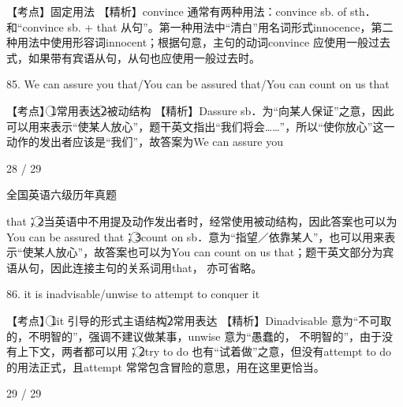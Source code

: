 \documentclass[UTF8,11pt]{ctexart}
\begin{document}
【考点】固定用法 【精析】convince 通常有两种用法：convince sb. of sth．和“convince sb. + that 从句”。第一种用法中“清白”用名词形式innocence，第二种用法中使用形容词innocent；根据句意，主句的动词convince 应使用一般过去式，如果带有宾语从句，从句也应使用一般过去时。


85. We can assure you that/You can be assured that/You can count on us that


【考点】\textcircled{1}常用表达\textcircled{2}被动结构 【精析】Dassure sb．为“向某人保证”之意，因此可以用来表示“使某人放心”，题干英文指出“我们将会……”，所以“使你放心”这一动作的发出者应该是“我们”，故答案为We can assure you


28 / 29


全国英语六级历年真题


that；\textcircled{2}当英语中不用提及动作发出者时，经常使用被动结构，因此答案也可以为You can be assured that；\textcircled{3}count on sb．意为“指望／依靠某人”，也可以用来表示“使某人放心”，故答案也可以为You can count on us that；题干英文部分为宾语从句，因此连接主句的关系词用that， 亦可省略。


86. it is inadvisable/unwise to attempt to conquer it


【考点】\textcircled{1}it 引导的形式主语结构\textcircled{2}常用表达 【精析】Dinadvisable 意为“不可取的，不明智的”，强调不建议做某事，unwise 意为“愚蠢的， 不明智的”，由于没有上下文，两者都可以用；\textcircled{2}try to do 也有“试着做”之意，但没有attempt to do 的用法正式，且attempt 常常包含冒险的意思，用在这里更恰当。


29 / 29
\end{document}
